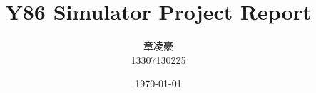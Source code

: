 \documentclass[12pt]{article}
\begin{document}
\pagestyle{fancy}
\lhead{\textbf{{\thetitle}}}
\rhead{\textbf{\nouppercase{\firstleftmark}}}
\cfoot{\thepage}

\title{\textbf{Y86 Simulator Project Report}}
\author{章凌豪\\13307130225}
\date{\today}
\maketitle

\tableofcontents
\clearpage






%
\end{document}
